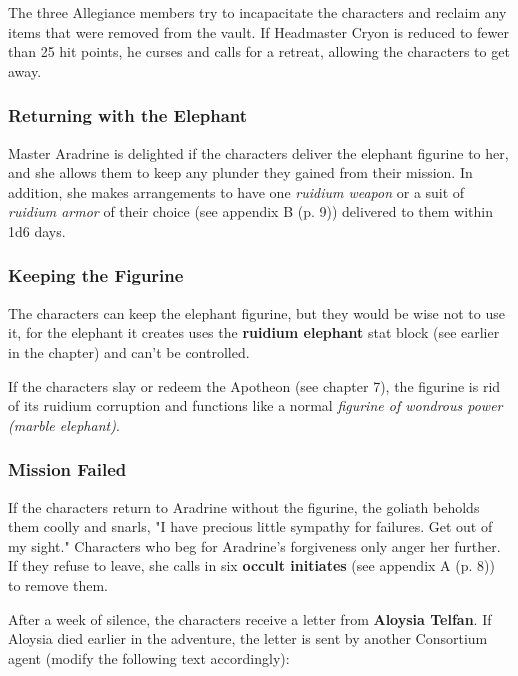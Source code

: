 \documentclass[a4paper, 11pt, bg=full, twocolumn, nooutline]{dndbook}
\begin{document}
The three Allegiance members try to incapacitate the characters and reclaim any items that were removed from the vault. If Headmaster Cryon is reduced to fewer than 25 hit points, he curses and calls for a retreat, allowing the characters to get away.


\subsubsection{Returning with the Elephant}

Master Aradrine is delighted if the characters deliver the elephant figurine to her, and she allows them to keep any plunder they gained from their mission. In addition, she makes arrangements to have one \textit{ruidium weapon} or a suit of \textit{ruidium armor} of their choice (see appendix B (p. 9)) delivered to them within 1d6 days.

\subsubsection{Keeping the Figurine}

The characters can keep the elephant figurine, but they would be wise not to use it, for the elephant it creates uses the \textbf{ruidium elephant} stat block (see earlier in the chapter) and can't be controlled.

If the characters slay or redeem the Apotheon (see chapter 7), the figurine is rid of its ruidium corruption and functions like a normal \textit{figurine of wondrous power (marble elephant)}.

\subsubsection{Mission Failed}

If the characters return to Aradrine without the figurine, the goliath beholds them coolly and snarls, "I have precious little sympathy for failures. Get out of my sight." Characters who beg for Aradrine's forgiveness only anger her further. If they refuse to leave, she calls in six \textbf{occult initiates} (see appendix A (p. 8)) to remove them.

After a week of silence, the characters receive a letter from \textbf{Aloysia Telfan}. If Aloysia died earlier in the adventure, the letter is sent by another Consortium agent (modify the following text accordingly):
\end{document}
